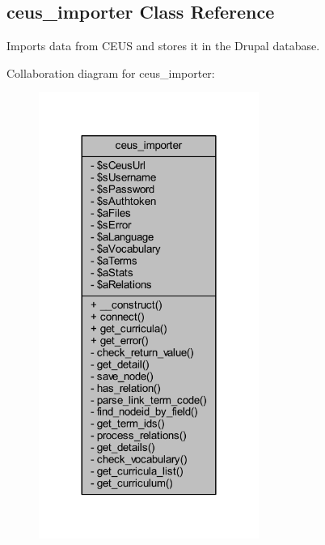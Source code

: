 \hypertarget{classceus__importer}{\subsection{ceus\+\_\+importer Class Reference}
\label{classceus__importer}
}


Imports data from C\+E\+U\+S and stores it in the Drupal database.  




Collaboration diagram for ceus\+\_\+importer\+:
\nopagebreak
\begin{figure}[H]
\begin{center}
\leavevmode
\includegraphics[width=204pt]{classceus__importer__coll__graph}
\end{center}
\end{figure}
